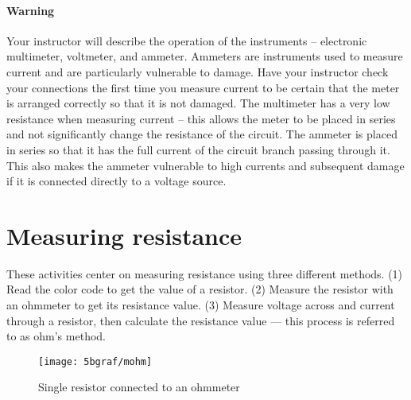 \paragraph{Warning}  Your instructor will describe the operation of the instruments -- electronic multimeter, voltmeter, and ammeter.  Ammeters are instruments used to measure current and are particularly vulnerable to damage.  Have your instructor check your connections the first time you measure current to be certain that the meter is arranged correctly so that it is not damaged. The multimeter has a very low resistance when measuring current --  this allows the meter to be placed in series and not significantly change the resistance of the circuit.  The ammeter is placed in series so that it has the full current of the circuit branch passing through it.  This also makes the ammeter vulnerable to high currents and subsequent damage if it is connected directly to a voltage source.

\section {Measuring resistance}
These activities center on measuring resistance using three different methods. (1) Read the color code to get the value of a resistor. (2) Measure the resistor with an ohmmeter to get  its resistance value. (3) Measure voltage across and current through a resistor, then calculate the resistance value --- this process is  referred to as ohm's method.

\begin{figure}[htb]
	\centering
	\texttt{[image: 5bgraf/mohm]} %
	\caption{Single resistor connected to an ohmmeter}
	\label{f:mohm}
\end{figure}

